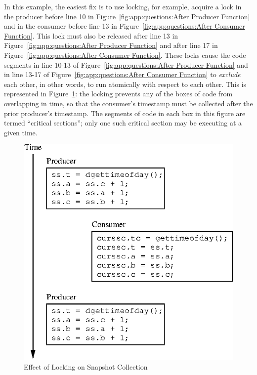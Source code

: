 In this example, the easiest fix is to use locking, for example,
acquire a lock in the producer before line 10 in
Figure~\ref{fig:app:questions:After Producer Function} and in
the consumer before line 13 in
Figure~\ref{fig:app:questions:After Consumer Function}.
This lock must also be released after line 13 in
Figure~\ref{fig:app:questions:After Producer Function} and
after line 17 in
Figure~\ref{fig:app:questions:After Consumer Function}.
These locks cause the code segments in line 10-13 of
Figure~\ref{fig:app:questions:After Producer Function} and in line 13-17 of
Figure~\ref{fig:app:questions:After Consumer Function} to {\em exclude}
each other, in other words, to run atomically with respect to each other.
This is represented in
Figure~\ref{fig:app:questions:Effect of Locking on Snapshot Collection}:
the locking prevents any of the boxes of code from overlapping in time, so
that the consumer's timestamp must be collected after the prior
producer's timestamp.
The segments of code in each box in this figure are termed
``critical sections''; only one such critical section may be executing
at a given time.

\begin{figure}[htb] 
\begin{center}
\includegraphics{appendix/questions/after}
\end{center}
\caption{Effect of Locking on Snapshot Collection}
\label{fig:app:questions:Effect of Locking on Snapshot Collection}
\end{figure}

